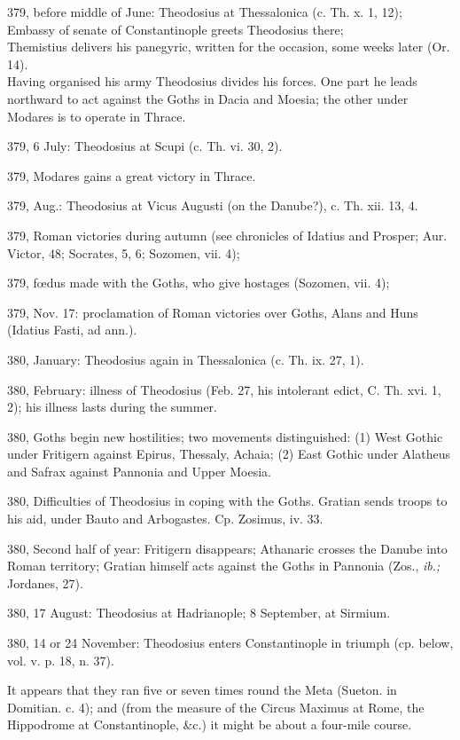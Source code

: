 379, before middle of June:
Theodosius at Thessalonica (c. Th. x. 1, 12);\\
Embassy of senate of Constantinople greets Theodosius there;\\
Themistius delivers his panegyric, written for the occasion, some weeks later (Or. 14).\\
Having organised his army Theodosius divides his forces. One part he leads northward to act against the Goths in Dacia and Moesia; the other under Modares is to operate in Thrace.

379, 6 July:
Theodosius at Scupi (c. Th. vi. 30, 2).

379,
Modares gains a great victory in Thrace.

379, Aug.:
Theodosius at Vicus Augusti (on the Danube?), c. Th. xii. 13, 4.

379,
Roman victories during autumn (see chronicles of Idatius and Prosper; Aur. Victor, 48; Socrates, 5, 6; Sozomen, vii. 4);

379,
fœdus made with the Goths, who give hostages (Sozomen, vii. 4);

379, Nov. 17:
proclamation of Roman victories over Goths, Alans and Huns (Idatius Fasti, ad ann.).

380, January:
Theodosius again in Thessalonica (c. Th. ix. 27, 1).

380, February:
illness of Theodosius (Feb. 27, his intolerant edict, C. Th. xvi. 1, 2); his illness lasts during the summer.

380,
Goths begin new hostilities; two movements distinguished: (1) West Gothic under Fritigern against Epirus, Thessaly, Achaia; (2) East Gothic under Alatheus and Safrax against Pannonia and Upper Moesia.

380,
Difficulties of Theodosius in coping with the Goths. Gratian sends troops to his aid, under Bauto and Arbogastes. Cp. Zosimus, iv. 33.

380, Second half of year:
Fritigern disappears; Athanaric crosses the Danube into Roman territory; Gratian himself acts against the Goths in Pannonia (Zos., \emph{ib.;} Jordanes, 27).

380, 17 August:
Theodosius at Hadrianople; 8 September, at Sirmium.

380, 14 or 24 November:
Theodosius enters Constantinople in triumph (cp. below, vol. v. p. 18, n. 37).

It appears that they ran five or seven times round the Meta (Sueton. in Domitian. c. 4); and (from the measure of the Circus Maximus at Rome, the Hippodrome at Constantinople, \&c.) it might be about a four-mile course.


